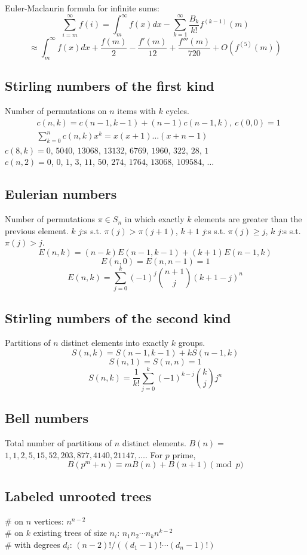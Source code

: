 		Euler-Maclaurin formula for infinite sums:
		\small
		\[ \sum_{i=m}^{\infty} f(i) = \int_m^\infty f(x) dx - \sum_{k=1}^\infty \frac{B_k}{k!}f^{(k-1)}(m) \]
		\[ \approx \int_{m}^\infty f(x)dx + \frac{f(m)}{2} - \frac{f'(m)}{12} + \frac{f'''(m)}{720} + O(f^{(5)}(m)) \]
		\normalsize

	\subsection{Stirling numbers of the first kind}
		Number of permutations on $n$ items with $k$ cycles.
		\begin{align*}
			&c(n,k) = c(n-1,k-1) + (n-1) c(n-1,k),\ c(0,0) = 1 \\
			&\textstyle \sum_{k=0}^n c(n,k)x^k = x(x+1) \dots (x+n-1)
		\end{align*}
		$c(8,k) = 0$, $5040$, $13068$, $13132$, $6769$, $1960$, $322$, $28$, $1$ \\
		$c(n,2) = 0$, $0$, $1$, $3$, $11$, $50$, $274$, $1764$, $13068$, $109584$, $\dots$

	\subsection{Eulerian numbers}
		Number of permutations $\pi \in S_n$ in which exactly $k$ elements are greater than the previous element. $k$ $j$:s s.t. $\pi(j)>\pi(j+1)$, $k+1$ $j$:s s.t. $\pi(j)\geq j$, $k$ $j$:s s.t. $\pi(j)>j$.
		$$E(n,k) = (n-k)E(n-1,k-1) + (k+1)E(n-1,k)$$
		$$E(n,0) = E(n,n-1) = 1$$
		$$E(n,k) = \sum_{j=0}^k(-1)^j\binom{n+1}{j}(k+1-j)^n$$

	\subsection{Stirling numbers of the second kind}
		Partitions of $n$ distinct elements into exactly $k$ groups.
		$$S(n,k) = S(n-1,k-1) + k S(n-1,k)$$
		$$S(n,1) = S(n,n) = 1$$
		$$S(n,k) = \frac{1}{k!}\sum_{j=0}^k (-1)^{k-j}\binom{k}{j}j^n$$

	\subsection{Bell numbers}
		Total number of partitions of $n$ distinct elements. $B(n) =$
		$1, 1, 2, 5, 15, 52, 203, 877, 4140, 21147, \dots$. For $p$ prime,
		\[ B(p^m+n)\equiv mB(n)+B(n+1) \pmod{p} \]

	\subsection{Labeled unrooted trees}
		\# on $n$ vertices: $n^{n-2}$ \\
		\# on $k$ existing trees of size $n_i$: $n_1n_2\cdots n_k n^{k-2}$ \\
		\# with degrees $d_i$: $(n-2)! / ((d_1-1)! \cdots (d_n-1)!)$

